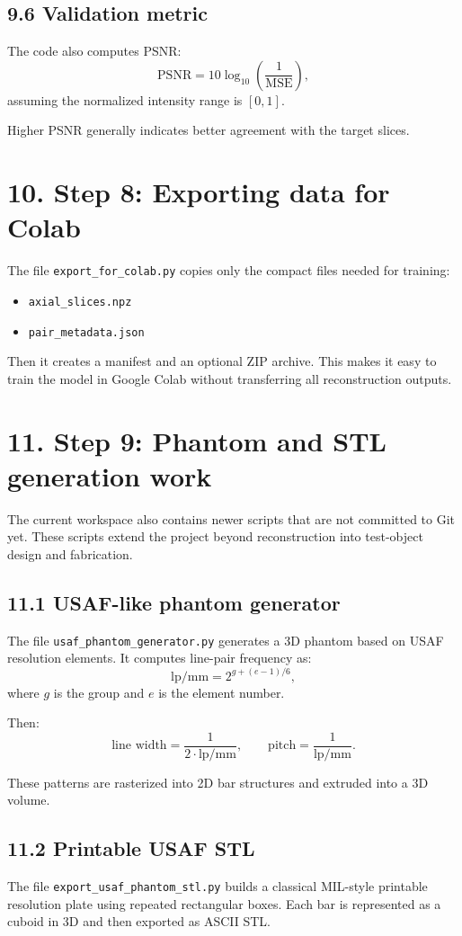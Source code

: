 \documentclass[12pt,a4paper]{article}
\begin{document}
\subsection*{9.6 Validation metric}
The code also computes PSNR:
\[
\text{PSNR} = 10 \log_{10}\left(\frac{1}{\text{MSE}}\right),
\]
assuming the normalized intensity range is $[0,1]$.

Higher PSNR generally indicates better agreement with the target slices.

\section*{10. Step 8: Exporting data for Colab}
The file \texttt{export\_for\_colab.py} copies only the compact files needed for training:
\begin{itemize}[leftmargin=*]
\item \texttt{axial\_slices.npz}
\item \texttt{pair\_metadata.json}
\end{itemize}

Then it creates a manifest and an optional ZIP archive. This makes it easy to train the model in Google Colab without transferring all reconstruction outputs.

\section*{11. Step 9: Phantom and STL generation work}
The current workspace also contains newer scripts that are not committed to Git yet. These scripts extend the project beyond reconstruction into test-object design and fabrication.

\subsection*{11.1 USAF-like phantom generator}
The file \texttt{usaf\_phantom\_generator.py} generates a 3D phantom based on USAF resolution elements. It computes line-pair frequency as:
\[
\text{lp/mm} = 2^{g + (e-1)/6},
\]
where $g$ is the group and $e$ is the element number.

Then:
\[
\text{line width} = \frac{1}{2\cdot \text{lp/mm}},\qquad
\text{pitch} = \frac{1}{\text{lp/mm}}.
\]

These patterns are rasterized into 2D bar structures and extruded into a 3D volume.

\subsection*{11.2 Printable USAF STL}
The file \texttt{export\_usaf\_phantom\_stl.py} builds a classical MIL-style printable resolution plate using repeated rectangular boxes. Each bar is represented as a cuboid in 3D and then exported as ASCII STL.
\end{document}
